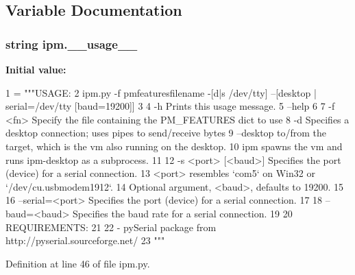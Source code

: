 \subsection{Variable Documentation}
\hypertarget{namespaceipm_aaf88bfa3dfbb4e8d749d20f306adb580}{
\subsubsection[{\-\_\-\-\_\-usage\-\_\-\-\_\-}]{\setlength{\rightskip}{0pt plus 5cm}string ipm.\-\_\-\-\_\-usage\-\_\-\-\_\-}}\label{namespaceipm_aaf88bfa3dfbb4e8d749d20f306adb580}
{\bfseries Initial value\-:}
\begin{DoxyCode}
1 = \textcolor{stringliteral}{"""USAGE:}
2 \textcolor{stringliteral}{    ipm.py -f pmfeaturesfilename -[d|s /dev/tty] --[desktop | serial=/dev/tty [baud=19200]]}
3 \textcolor{stringliteral}{}
4 \textcolor{stringliteral}{    -h          Prints this usage message.}
5 \textcolor{stringliteral}{    --help}
6 \textcolor{stringliteral}{}
7 \textcolor{stringliteral}{    -f <fn>     Specify the file containing the PM\_FEATURES dict to use}
8 \textcolor{stringliteral}{    -d          Specifies a desktop connection; uses pipes to send/receive bytes}
9 \textcolor{stringliteral}{    --desktop   to/from the target, which is the vm also running on the desktop.}
10 \textcolor{stringliteral}{                ipm spawns the vm and runs ipm-desktop as a subprocess.}
11 \textcolor{stringliteral}{}
12 \textcolor{stringliteral}{    -s <port> [<baud>] Specifies the port (device) for a serial connection.}
13 \textcolor{stringliteral}{                <port> resembles `com5` on Win32 or `/dev/cu.usbmodem1912`.}
14 \textcolor{stringliteral}{                Optional argument, <baud>, defaults to 19200.}
15 \textcolor{stringliteral}{}
16 \textcolor{stringliteral}{    --serial=<port> Specifies the port (device) for a serial connection.}
17 \textcolor{stringliteral}{}
18 \textcolor{stringliteral}{    --baud=<baud>   Specifies the baud rate for a serial connection.}
19 \textcolor{stringliteral}{}
20 \textcolor{stringliteral}{REQUIREMENTS:}
21 \textcolor{stringliteral}{}
22 \textcolor{stringliteral}{    - pySerial package from http://pyserial.sourceforge.net/}
23 \textcolor{stringliteral}{    """}
\end{DoxyCode}


Definition at line 46 of file ipm.\-py.

